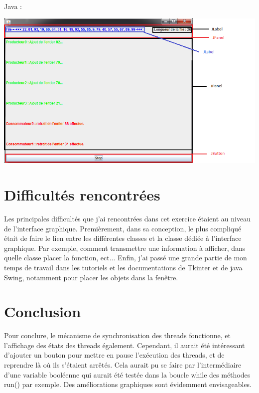 \documentclass{article}
\begin{document}
\cleardoublepage

Java :
\begin{center}
  \includegraphics[scale=0.8]{zonesJava.PNG}
\end{center}

\section{Difficultés rencontrées}
\label{section:difficultées}
Les principales difficultés que j'ai rencontrées dans cet exercice étaient au niveau de l'interface graphique.
Premièrement, dans sa conception, le plus compliqué était de faire le lien entre les différentes classes et la classe dédiée à l'interface graphique. Par exemple, comment transmettre une information à afficher, dans quelle classe placer la fonction, ect...
Enfin, j'ai passé une grande partie de mon temps de travail dans les tutoriels et les documentations de Tkinter et de java Swing, notamment pour placer les objets dans la fenêtre.


\section{Conclusion}
\label{section:conclusion}
Pour conclure, le mécanisme de synchronisation des threads fonctionne, et l'affichage des états des threads également. Cependant, il aurait été intéressant d'ajouter un bouton pour mettre en pause l'exécution des threads, et de reprendre là où ils s'étaient arrêtés. Cela aurait pu se faire par l'intermédiaire d'une variable booléenne qui aurait été testée dans la boucle while des méthodes run() par exemple. Des améliorations graphiques sont évidemment envisageables.



\end{document}
